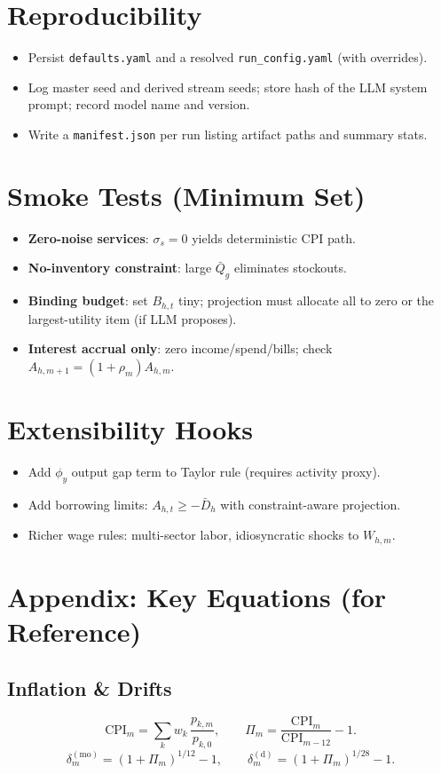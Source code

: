 \documentclass[12pt]{article}
\begin{document}
\section{Reproducibility}
\begin{itemize}
  \item Persist \texttt{defaults.yaml} and a resolved \texttt{run\_config.yaml} (with overrides).
  \item Log master seed and derived stream seeds; store hash of the LLM system prompt; record model name and version.
  \item Write a \texttt{manifest.json} per run listing artifact paths and summary stats.
\end{itemize}

\section{Smoke Tests (Minimum Set)}
\begin{itemize}
  \item \textbf{Zero-noise services}: $\sigma_s=0$ yields deterministic CPI path.
  \item \textbf{No-inventory constraint}: large $\bar{Q}_g$ eliminates stockouts.
  \item \textbf{Binding budget}: set $B_{h,t}$ tiny; projection must allocate all to zero or the largest-utility item (if LLM proposes).
  \item \textbf{Interest accrual only}: zero income/spend/bills; check $A_{h,m+1}=(1+\rho_m)A_{h,m}$.
\end{itemize}

\section{Extensibility Hooks}
\begin{itemize}
  \item Add $\phi_y$ output gap term to Taylor rule (requires activity proxy).
  \item Add borrowing limits: $A_{h,t}\ge -\bar{D}_h$ with constraint-aware projection.
  \item Richer wage rules: multi-sector labor, idiosyncratic shocks to $W_{h,m}$.
\end{itemize}

\section{Appendix: Key Equations (for Reference)}
\subsection*{Inflation \& Drifts}
$$
\mathrm{CPI}_m=\sum_{k} w_k\,\frac{p_{k,m}}{p_{k,0}},\qquad
\Pi_m=\frac{\mathrm{CPI}_m}{\mathrm{CPI}_{m-12}}-1.
$$
$$
\delta_m^{(\mathrm{mo})}=(1+\Pi_m)^{1/12}-1,\qquad
\delta_m^{(\mathrm{d})}=(1+\Pi_m)^{1/28}-1.
$$
\end{document}
